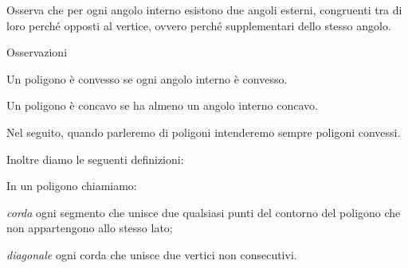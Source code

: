 \begin{inaccessibleblock}
\begin{center}\end{center}
\end{inaccessibleblock}

\begin{minipage}{.49\textwidth}
 Osserva che per ogni angolo interno esistono due angoli esterni, 
congruenti tra di loro perché opposti al vertice, ovvero perché 
supplementari dello stesso angolo.
\end{minipage}
\begin{minipage}{.49\textwidth}
 \begin{inaccessibleblock}
\begin{center}\end{center}
\end{inaccessibleblock}
\end{minipage}

Osservazioni
\begin{itemize*}
\item Un poligono è convesso se ogni angolo interno è convesso.
\item Un poligono è concavo se ha almeno un angolo interno concavo.
\end{itemize*}

Nel seguito, quando parleremo di poligoni intenderemo sempre poligoni 
convessi.

Inoltre diamo le seguenti definizioni:
\begin{definizione}
In un poligono chiamiamo:
\begin{itemize*}
\item \emph{corda} ogni segmento che unisce due qualsiasi punti del 
contorno del poligono che non appartengono allo stesso lato;
\item \emph{diagonale} ogni corda che unisce due vertici non 
consecutivi.
\end{itemize*}
\end{definizione}

